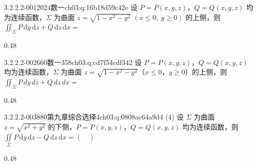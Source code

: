\par\addvspace{2.4ex}\noindent
\begin{minipage}{\linewidth}

\begin{q}{3.2.2.2-001}{2024数一}{ch03:q:16b18d59c42e}
设 $P=P(x,y,z)$，$Q=Q(x,y,z)$ 均为连续函数，$\Sigma$ 为曲面 $z=\sqrt{1-x^2-y^2}$ $(x\leqslant 0,\ y\geqslant 0)$ 的上侧，则 $\displaystyle\iint_{\Sigma}P\,\mathrm{d}y\,\mathrm{d}z+Q\,\mathrm{d}z\,\mathrm{d}x=$
\begin{opts}{0.48}
\hfill{}\\[0.3ex]
\hfill{}
\end{opts}
\end{q}
\end{minipage}


\begin{q}{3.2.2.2-002}{660数一358}{ch03:q:cd7f54cdf342}
设 $P=P(x,y,z)$，$Q=Q(x,y,z)$ 均为连续函数，$\Sigma$ 为曲面 $z=\sqrt{1-x^2-y^2}$（$x\le 0$，$y\ge 0$）的上侧，则
$\displaystyle \iint_{\Sigma} P\,dy\,dz+Q\,dz\,dx=$
\begin{opts}{0.48}
\hfill{}\\[0.3ex]
\hfill{}
\end{opts}
\end{q}

\begin{q}{3.2.2.2-003}{880第九章综合选择4}{ch03:q:0808ac64a9d4}
(4) 设 $\Sigma$ 为曲面 $z=\sqrt{x^2+y^2}$ 的下侧，$P=P(x,y,z)$，$Q=Q(x,y,z)$ 均为连续函数，则 $\displaystyle \iint\limits_{\Sigma} P\,\mathrm{d}y\,\mathrm{d}z - Q\,\mathrm{d}z\,\mathrm{d}x = (\quad)$
\begin{opts}{0.48}
\hfill{}\\[0.3ex]
\hfill{}
\end{opts}
\end{q}

